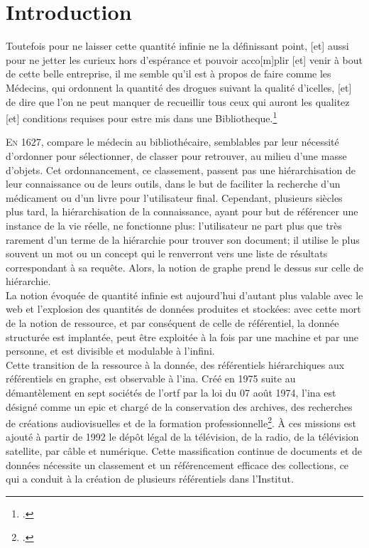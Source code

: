 	\chapter*{Introduction}

\begin{citationLongue}
	Toutefois pour ne laisser cette quantité infinie ne la définissant point, [et] aussi pour ne jetter les curieux hors d'espérance et pouvoir acco[m]plir [et] venir à bout de cette belle entreprise, il me semble qu'il est à propos de faire comme les Médecins, qui ordonnent la quantité des drogues suivant la qualité d'icelles, [et] de dire que l'on ne peut manquer de recueillir tous ceux qui auront les qualitez [et] conditions requises pour estre mis dans une Bibliotheque.\footcite[p.41-42]{naude_advis_1627}
\end{citationLongue}


\lettrine{E}n 1627,  compare le médecin au bibliothécaire, semblables par leur nécessité d'ordonner pour sélectionner, de classer pour retrouver, au milieu d'une masse d'objets. Cet ordonnancement, ce classement, passent pas une hiérarchisation de leur connaissance ou de leurs outils, dans le but de faciliter la recherche d'un médicament ou d'un livre pour l'utilisateur final. Cependant, plusieurs siècles plus tard, la hiérarchisation de la connaissance, ayant pour but de référencer une instance de la vie réelle, ne fonctionne plus: l'utilisateur ne part plus que très rarement d'un terme de la hiérarchie pour trouver son document; il utilise le plus souvent un mot ou un concept qui le renverront vers une liste de résultats correspondant à sa requête. Alors, la notion de graphe prend le dessus sur celle de hiérarchie.\\

La notion évoquée de \og quantité infinie \fg{} est aujourd'hui d'autant plus valable avec le web et l'explosion des quantités de données produites et stockées: avec cette mort de la notion de ressource, et par conséquent de celle de référentiel, la donnée structurée est implantée, peut être exploitée à la fois par une machine et par une personne, et est divisible et modulable à l'infini.\\

Cette transition de la ressource à la donnée, des référentiels hiérarchiques aux référentiels en graphe, est observable à l'\ac{ina}. Créé en 1975 suite au démantèlement en sept sociétés de l'\ac{ortf} par la loi du 07 août 1974, l'\ac{ina} est désigné comme un \ac{epic} et \og chargé de la conservation des archives, des recherches de créations audiovisuelles et de la formation professionnelle\fg{}\footcite[art.3]{noauthor_loi_1974}. À ces missions est ajouté à partir de 1992 le dépôt légal de la télévision, de la radio, de la télévision satellite, par câble et numérique. Cette massification continue de documents et de données nécessite un classement et un référencement efficace des collections, ce qui a conduit à la création de plusieurs référentiels dans l'Institut.\\

